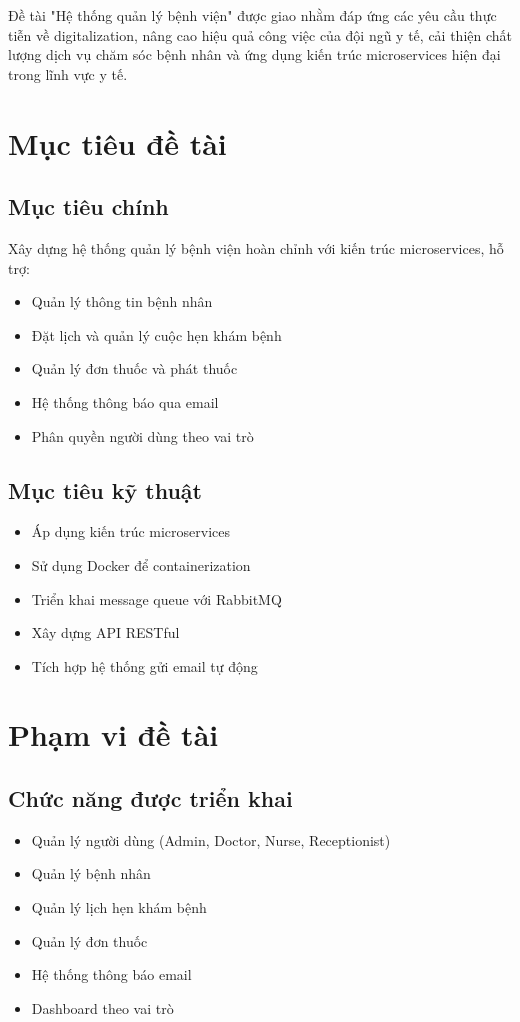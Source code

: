 \documentclass[12pt,a4paper]{report}
\begin{document}
Đề tài "Hệ thống quản lý bệnh viện" được giao nhằm đáp ứng các yêu cầu thực tiễn về digitalization, nâng cao hiệu quả công việc của đội ngũ y tế, cải thiện chất lượng dịch vụ chăm sóc bệnh nhân và ứng dụng kiến trúc microservices hiện đại trong lĩnh vực y tế.

\section{Mục tiêu đề tài}
\subsection{Mục tiêu chính}
Xây dựng hệ thống quản lý bệnh viện hoàn chỉnh với kiến trúc microservices, hỗ trợ:
\begin{itemize}
    \item Quản lý thông tin bệnh nhân
    \item Đặt lịch và quản lý cuộc hẹn khám bệnh
    \item Quản lý đơn thuốc và phát thuốc
    \item Hệ thống thông báo qua email
    \item Phân quyền người dùng theo vai trò
\end{itemize}

\subsection{Mục tiêu kỹ thuật}
\begin{itemize}
    \item Áp dụng kiến trúc microservices
    \item Sử dụng Docker để containerization
    \item Triển khai message queue với RabbitMQ
    \item Xây dựng API RESTful
    \item Tích hợp hệ thống gửi email tự động
\end{itemize}

\section{Phạm vi đề tài}
\subsection{Chức năng được triển khai}
\begin{itemize}
    \item Quản lý người dùng (Admin, Doctor, Nurse, Receptionist)
    \item Quản lý bệnh nhân
    \item Quản lý lịch hẹn khám bệnh
    \item Quản lý đơn thuốc
    \item Hệ thống thông báo email
    \item Dashboard theo vai trò
\end{itemize}
\end{document}
